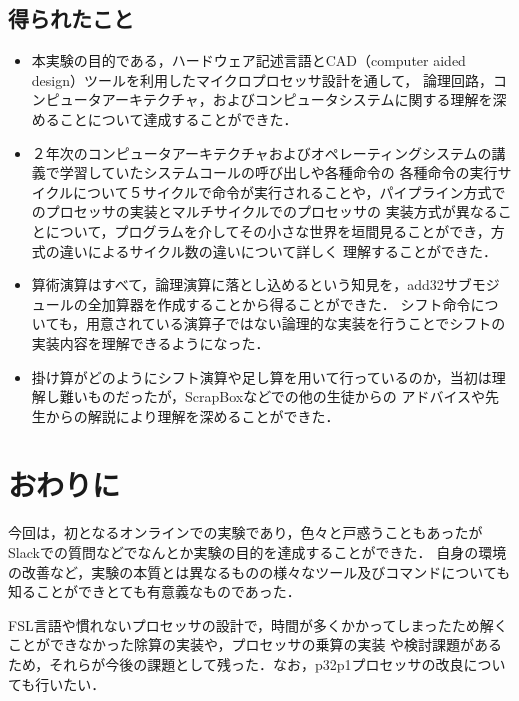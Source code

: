 \documentclass{jarticle}[11pt]
\begin{document}
  \subsection{得られたこと}

  \begin{itemize}
    \item 本実験の目的である，ハードウェア記述言語とCAD（computer aided design）ツールを利用したマイクロプロセッサ設計を通して，
    論理回路，コンピュータアーキテクチャ，およびコンピュータシステムに関する理解を深めることについて達成することができた．

    \item ２年次のコンピュータアーキテクチャおよびオペレーティングシステムの講義で学習していたシステムコールの呼び出しや各種命令の
    各種命令の実行サイクルについて５サイクルで命令が実行されることや，パイプライン方式でのプロセッサの実装とマルチサイクルでのプロセッサの
    実装方式が異なることについて，プログラムを介してその小さな世界を垣間見ることができ，方式の違いによるサイクル数の違いについて詳しく
    理解することができた．

    \item 算術演算はすべて，論理演算に落とし込めるという知見を，add32サブモジュールの全加算器を作成することから得ることができた．
    シフト命令についても，用意されている演算子ではない論理的な実装を行うことでシフトの実装内容を理解できるようになった．

    \item 掛け算がどのようにシフト演算や足し算を用いて行っているのか，当初は理解し難いものだったが，ScrapBoxなどでの他の生徒からの
    アドバイスや先生からの解説により理解を深めることができた．
  \end{itemize}

  \section{おわりに}\label{sec:おわりに}

  今回は，初となるオンラインでの実験であり，色々と戸惑うこともあったがSlackでの質問などでなんとか実験の目的を達成することができた．
  自身の環境の改善など，実験の本質とは異なるものの様々なツール及びコマンドについても知ることができとても有意義なものであった．

  FSL言語や慣れないプロセッサの設計で，時間が多くかかってしまったため解くことができなかった除算の実装や，プロセッサの乗算の実装
  や検討課題があるため，それらが今後の課題として残った．なお，p32p1プロセッサの改良についても行いたい．
\end{document}
